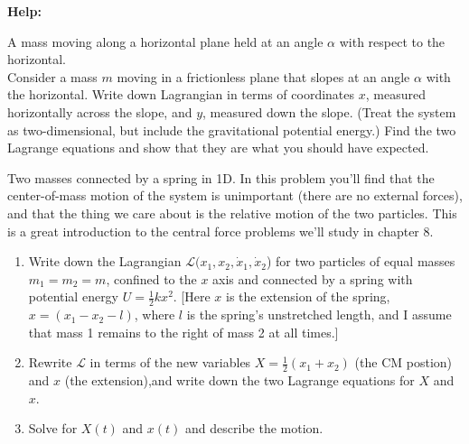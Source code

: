 \documentclass[11pt,letterpaper,boxed]{../hmcpset}
\newcommand{\half}{\frac{1}{2}}
\begin{document}
\textbf{Help:}

\begin{problem}[7.4]
A mass moving along a horizontal plane held at an angle $\alpha$ with respect to the horizontal.\\
Consider a mass $m$ moving in a frictionless plane that slopes at an angle $\alpha$ with the horizontal.  Write down Lagrangian in terms of coordinates $x$, measured horizontally across the slope, and $y$, measured down the slope. (Treat the system as two-dimensional, but include the gravitational potential energy.) Find the two Lagrange equations and show that they are what you should have expected.
\end{problem}


\begin{solution}



\vfill
\end{solution}

\newpage

\begin{problem}[7.8]
Two masses connected by a spring in 1D. In this problem you'll find that the center-of-mass motion of the system is unimportant (there are no external forces), and that the thing we care about is the relative motion of the two particles. This is a great introduction to the central force problems we'll study in chapter 8.\\
\begin{enumerate}
\item Write down the Lagrangian $\mathcal{L}(x_1, x_2, \dot x_1, \dot x_2$) for two particles of equal masses $m_1 = m_2 = m$, confined to the $x$ axis and connected by a spring with potential energy $U = \half k x^2$. [Here $x$ is the extension of the spring, $x = (x_1 - x_2 - l)$, where $l$ is the spring's unstretched length, and I assume that mass 1 remains to the right of mass 2 at all times.] 
\item Rewrite $\mathcal{L}$ in terms of the new variables $X = \half(x_1 + x_2)$ (the CM postion) and $x$ (the extension),and write down the two Lagrange equations for $X$ and $x$.
\item Solve for $X(t)$ and $x(t)$ and describe the motion.

\end{enumerate}

\end{problem}
\begin{solution}



\vfill
\end{solution}
\end{document}
